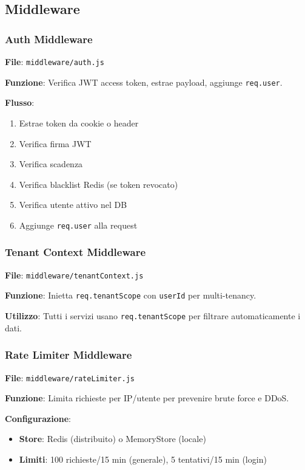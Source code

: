 \documentclass[11pt,a4paper]{article}
\begin{document}
\subsection{Middleware}

\subsubsection{Auth Middleware}

\textbf{File}: \texttt{middleware/auth.js}

\textbf{Funzione}: Verifica JWT access token, estrae payload, aggiunge \texttt{req.user}.

\textbf{Flusso}:
\begin{enumerate}
    \item Estrae token da cookie o header
    \item Verifica firma JWT
    \item Verifica scadenza
    \item Verifica blacklist Redis (se token revocato)
    \item Verifica utente attivo nel DB
    \item Aggiunge \texttt{req.user} alla request
\end{enumerate}

\subsubsection{Tenant Context Middleware}

\textbf{File}: \texttt{middleware/tenantContext.js}

\textbf{Funzione}: Inietta \texttt{req.tenantScope} con \texttt{userId} per multi-tenancy.

\textbf{Utilizzo}: Tutti i servizi usano \texttt{req.tenantScope} per filtrare automaticamente i dati.

\subsubsection{Rate Limiter Middleware}

\textbf{File}: \texttt{middleware/rateLimiter.js}

\textbf{Funzione}: Limita richieste per IP/utente per prevenire brute force e DDoS.

\textbf{Configurazione}:
\begin{itemize}
    \item \textbf{Store}: Redis (distribuito) o MemoryStore (locale)
    \item \textbf{Limiti}: 100 richieste/15 min (generale), 5 tentativi/15 min (login)
\end{itemize}
\end{document}
